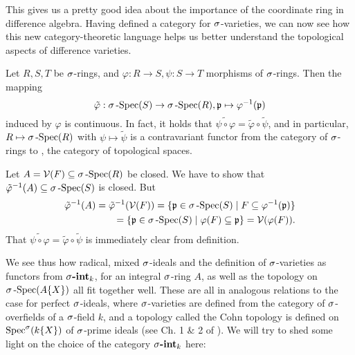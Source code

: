 This gives us a pretty good idea about the importance of the coordinate ring in difference algebra.
Having defined a category for $\sigma$-varieties, we can now see how this new category-theoretic language helps us better understand the topological aspects of difference varieties.

\begin{lem}\label{inducedcont}
Let $R,S,T$ be $\sigma$-rings, and $\varphi: R \rightarrow S, \psi: S \rightarrow T$ morphisms of $\sigma$-rings. Then the mapping $$\tilde \varphi: \sigma\operatorname{-Spec}(S) \rightarrow \sigma\operatorname{-Spec}(R), \mathfrak{p} \mapsto \varphi^{-1}(\mathfrak{p})$$ 
induced by $\varphi$ is continuous. 
In fact, it holds that $\widetilde{ \psi \circ \varphi} = \tilde \varphi \circ \tilde \psi$, and in particular, $R \mapsto \sigma\operatorname{-Spec}(R)$ with $\psi \mapsto\tilde \psi$ is a contravariant functor from the category of $\sigma$-rings to \Top, the category of topological spaces.
\begin{bew}
Let $A = \mathcal{V}(F) \subseteq \sigma\operatorname{-Spec}(R)$ be closed. We have to show that $\tilde \varphi^{-1}(A) \subseteq \sigma\operatorname{-Spec}(S)$ is closed.
But 
\begin{align*} \tilde \varphi^{-1}(A) = \tilde \varphi^{-1}(\mathcal{V}(F)) = \{ \mathfrak{p} \in \sigma\operatorname{-Spec}(S) \mid F \subseteq \varphi^{-1}(\mathfrak{p}) \} \\ = \{\mathfrak{p} \in \sigma\operatorname{-Spec}(S) \mid \varphi(F) \subseteq \mathfrak{p} \} = \mathcal{V}(\varphi(F)). \end{align*}
That $\widetilde{ \psi \circ \varphi} = \tilde \varphi \circ \tilde \psi$ is immediately clear from definition.
\end{bew}
\end{lem}

We see thus how radical, mixed $\sigma$-ideals and the definition of $\sigma$-varieties as functors from $\sigma\text{{\normalfont\textbf{-int}}}_k$, for an integral $\sigma$-ring $A$, as well as the topology on $\sigma\operatorname{-Spec}(A\{X\})$ all fit together well. 
These are all in analogous relations to the case for perfect $\sigma$-ideals, where $\sigma$-varieties are defined from the category of $\sigma$-overfields of a $\sigma$-field $k$, and a topology called the Cohn topology is defined on $\operatorname{Spec}^\sigma(k\{X\})$ of $\sigma$-prime ideals (see Ch. 1 \& 2 of \cite{wibmer}).
We will try to shed some light on the choice of the category $\sigma\text{{\normalfont\textbf{-int}}}_k$ here:

